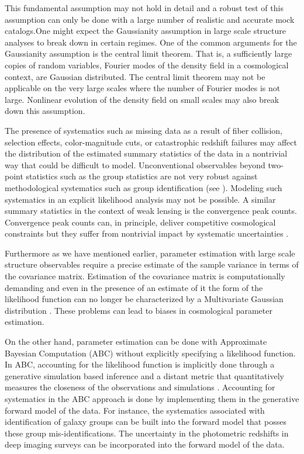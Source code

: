 This fundamental assumption may not hold in detail and a robust test of this assumption can only be done with a large 
number of realistic and accurate mock catalogs.One might expect the Gaussianity assumption in large scale structure analyses 
to break down in certain regimes. One of the common arguments for the Gaussianity assumption is the central limit theorem. That is, a sufficiently large copies 
of random variables, Fourier modes of the density field in a cosmological context, are Gaussian distributed. The central limit theorem may not be applicable on 
the very large scales where the number of Fourier modes is not large. Nonlinear evolution of the density field on small scales may also break down this assumption. 

The presence of systematics such as missing data as a result of fiber collision, selection effects, color-magnitude cuts, or catastrophic redshift 
failures \citep{Guo:2012a,Ross:2012aa,Hahn:2017a} may affect the distribution of the estimated summary statistics of the data in a nontrivial way 
that could be difficult to model. Unconventional observables beyond two-point statistics such as the group statistics are not very 
robust against methodological systematics such as group identification (see \citealt{berlind2006,campbell2015}). Modeling such systematics in an explicit likelihood analysis may not be possible. A similar summary statistics in the context of weak lensing is the convergence peak counts. Convergence peak counts can, in principle, deliver competitive cosmological constraints but they suffer from nontrivial impact by systematic uncertainties \citep{abcwl2}. 

Furthermore as we have mentioned earlier, parameter estimation with large scale structure observables require a precise estimate of 
the sample variance in terms of the covariance matrix. Estimation of the covariance matrix is computationally demanding \citep{nifty,harnois} and even 
in the presence of an estimate of it the form of the likelihood function can no longer be characterized by a Multivariate Gaussian distribution \citep{Sellentin:2016a,Sellentin:2017a}.
These problems can lead to biases in cosmological parameter estimation.

On the other hand, parameter estimation can be done with Approximate Bayesian Computation (ABC) without explicitly specifying a likelihood function. 
In ABC, accounting for the likelihood function is implicitly done through a generative simulation based inference and a distant metric that quantitatively 
measures the closeness of the observations and simulations \citep{optimalkernel,abcpmc}. Accounting for systematics in the ABC approach is done by implementing 
them in the generative forward model of the data. For instance, the systematics associated with identification of galaxy groups can be built into the forward model that posses these group mis-identifications. The uncertainty in the photometric redshifts in deep imaging surveys can be incorporated into the forward model of the data.   

